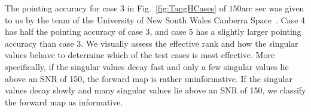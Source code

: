 The pointing accuracy for case 3 in Fig.~\ref{fig:TangHCases} of $150\text{arc sec}$ was given to us by the team of the University of New South Wales Canberra Space~\cite{CubeSatInternal}.
Case 4 has half the pointing accuracy of case 3, and case 5 has a slightly larger pointing accuracy than case 3.
We visually assess the effective rank and how the singular values behave to determine which of the test cases is most effective.
More specifically, if the singular values decay fast and only a few singular values lie above an SNR of 150, the forward map is rather uninformative.
If the singular values decay slowly and many singular values lie above an SNR of 150, we classify the forward map as informative.

